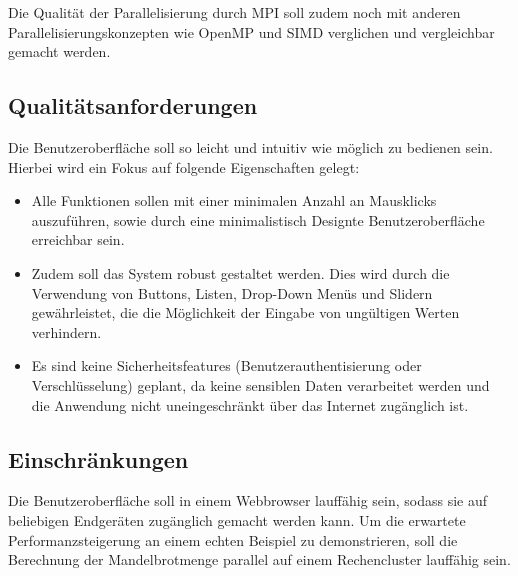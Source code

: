 Die Qualität der Parallelisierung durch MPI soll zudem noch mit anderen Parallelisierungskonzepten
wie OpenMP und SIMD verglichen und vergleichbar gemacht werden.

\subsection{Qualitätsanforderungen}

Die Benutzeroberfläche soll so leicht und intuitiv wie möglich zu bedienen sein.
Hierbei wird ein Fokus auf folgende Eigenschaften gelegt:
\begin{itemize}
	\item Alle Funktionen sollen mit einer minimalen
	      Anzahl an Mausklicks auszuführen, sowie durch eine
	      minimalistisch Designte Benutzeroberfläche erreichbar sein.
	\item Zudem soll das System robust gestaltet werden.
	      Dies wird durch die Verwendung von Buttons, Listen, Drop-Down Menüs und Slidern gewährleistet,
          die die Möglichkeit der Eingabe von ungültigen Werten verhindern.
	\item Es sind keine Sicherheitsfeatures (Benutzerauthentisierung oder Verschlüsselung) geplant,
	      da keine sensiblen Daten verarbeitet werden und die Anwendung nicht uneingeschränkt über das Internet zugänglich ist.
\end{itemize}



\subsection{Einschränkungen}

Die Benutzeroberfläche soll in einem Webbrowser lauffähig sein, sodass sie auf beliebigen Endgeräten
zugänglich gemacht werden kann.
Um die erwartete Performanzsteigerung an einem echten Beispiel zu demonstrieren,
soll die Berechnung der Mandelbrotmenge parallel auf einem Rechencluster lauffähig sein.


